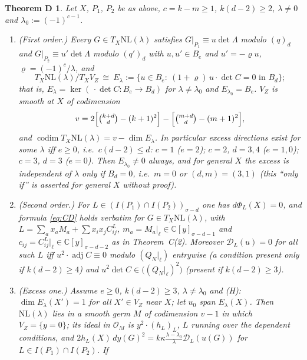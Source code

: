 \documentclass[10pt]{article}
\numberwithin{equation}{section}
\newtheorem*{thmD}{Theorem D}
\theoremstyle{remark}
\newcommand{\CC}{\mathbb{C}}
\newcommand{\NL}{\mathrm{NL}}
\newcommand{\VZ}{V_Z}
\newcommand{\cD}{\mathcal{D}}
\newcommand{\codim}{\operatorname{codim}}
\newcommand{\adj}{\operatorname{adj}}
\begin{document}
\begin{thmD}
Let $X$, $P_1$, $P_2$ be as above, $c=k-m\ge1$, $k(d-2)\ge2$, $\lambda\ne0$ and $\lambda_0:=(-1)^{c-1}$.
\begin{enumerate}[label=\textup{(\arabic*)}]
\item \textup{(First order.)} Every $G\in T_X\NL(\lambda)$ satisfies $G|_{P_1}\equiv u\det\Lambda$ modulo
$(q)_d$ and $G|_{P_2}\equiv u'\det\Lambda$ modulo $(q')_d$ with $u,u'\in B_e$ and $u'=-\varrho u$,
$\varrho=(-1)^c/\lambda$, and
\begin{equation}\label{eq:E}
T_X\NL(\lambda)/T_X\VZ\ \cong\ E_\lambda:=\{u\in B_e:\ (1+\varrho)\,u\cdot\det C=0\text{ in }B_d\};
\end{equation}
that is, $E_\lambda=\ker(\,\cdot\det C:B_e\to B_d)$ for $\lambda\ne\lambda_0$ and $E_{\lambda_0}=B_e$. $\VZ$ is
smooth at $X$ of codimension
\begin{equation}\label{eq:v}
v=2\Bigl[\tbinom{k+d}{d}-(k+1)^2\Bigr]-\Bigl[\tbinom{m+d}{d}-(m+1)^2\Bigr],
\end{equation}
and $\codim T_X\NL(\lambda)=v-\dim E_\lambda$. In particular excess directions exist for some $\lambda$ iff
$e\ge0$, i.e.\ $c(d-2)\le d$: $c=1$ \textup{(}$e=2$\textup{)}; $c=2$, $d=3,4$ \textup{(}$e=1,0$\textup{)};
$c=3$, $d=3$ \textup{(}$e=0$\textup{)}. Then $E_{\lambda_0}\neq0$ always, and for general $X$ the excess is
independent of $\lambda$ only if $B_d=0$, i.e.\ $m=0$ or $(d,m)=(3,1)$ \textup{(}this ``only if'' is asserted
for general $X$ without proof\textup{)}.
\item \textup{(Second order.)} For $L\in(I(P_1)\cap I(P_2))_{\sigma-d}$ one has $d\Phi_L(X)=0$, and formula
\eqref{eq:CD} holds verbatim for $G\in T_X\NL(\lambda)$, with $L=\sum_ax_aM_a+\sum x_ix_jC^L_{ij}$,
$m_a=M_a|_\ell\in\CC[y]_{\sigma-d-1}$ and $c_{ij}=C^L_{ij}|_\ell\in\CC[y]_{\sigma-d-2}$ as in
Theorem~C\textup{(2)}. Moreover $\cD_L(u)=0$ for all such $L$ iff
$u^2\cdot\adj C\equiv0$ modulo $(Q_N|_\ell)$ entrywise \textup{(}a condition present only if $k(d-2)\ge4$\textup{)}
and $u^2\det C\in\bigl((Q_N|_\ell)^2\bigr)$ \textup{(}present if $k(d-2)\ge3$\textup{)}.
\item \textup{(Excess one.)} Assume $e\ge0$, $k(d-2)\ge3$, $\lambda\ne\lambda_0$ and
\textup{(H)}: $\dim E_\lambda(X')=1$ for all $X'\in\VZ$ near $X$; let $u_0$ span $E_\lambda(X)$. Then
$\NL(\lambda)$ lies in a smooth germ $M$ of codimension $v-1$ in which $\VZ=\{y=0\}$; its ideal in
$\mathcal O_M$ is $y^2\cdot(h_L)_L$, $L$ running over the dependent conditions, and
$2h_L(X)\,dy(G)^2=k\kappa\frac{\lambda-\lambda_0}{\lambda}\cD_L(u(G))$ for $L\in I(P_1)\cap I(P_2)$. If

\end{enumerate}
\end{thmD}
\end{document}
